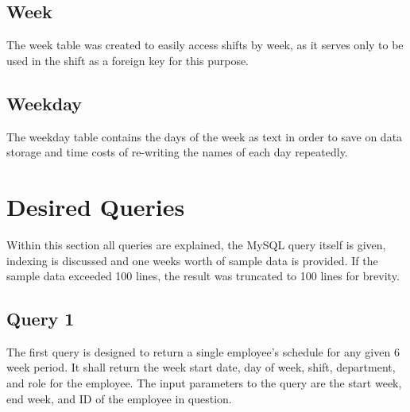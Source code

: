 \documentclass[letter,12pt]{texMemo}
\begin{document}
	\subsection*{Week}
		The week table was created to easily access shifts by week, as it serves only to be used in the shift as a foreign key for this purpose.
		
	\subsection*{Weekday}
		The weekday table contains the days of the week as text in order to save on data storage and time costs of re-writing the names of each day repeatedly.
		

\newpage
\section*{Desired Queries}
Within this section all queries are explained, the MySQL query itself is given, indexing is discussed and one weeks worth of sample data is provided. If the sample data exceeded 100 lines, the result was truncated to 100 lines for brevity.
\subsection*{Query 1}
The first query is designed to return a single employee's schedule for any given 6 week period. It shall return the week start date, day of week, shift, department, and role for the employee. The input parameters to the query are the start week, end week, and ID of the employee in question.
\end{document}
